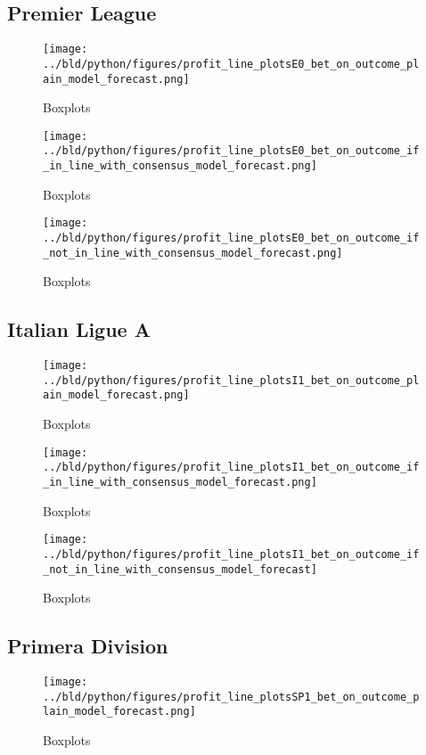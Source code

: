 \documentclass[11pt, a4paper, leqno]{article}
\begin{document}
\subsection{Premier League}
\begin{figure}[H]
    \centering
    \texttt{[image: ../bld/python/figures/profit\_line\_plotsE0\_bet\_on\_outcome\_plain\_model\_forecast.png]}
    \caption{Boxplots}
    \label{fig:figure2}
\end{figure}

\begin{figure}[H]
    \centering
    \texttt{[image: ../bld/python/figures/profit\_line\_plotsE0\_bet\_on\_outcome\_if\_in\_line\_with\_consensus\_model\_forecast.png]}
    \caption{Boxplots}
    \label{fig:figure2}
\end{figure}
\begin{figure}[H]
    \centering
    \texttt{[image: ../bld/python/figures/profit\_line\_plotsE0\_bet\_on\_outcome\_if\_not\_in\_line\_with\_consensus\_model\_forecast.png]}
    \caption{Boxplots}
    \label{fig:figure2}
\end{figure}





\subsection{Italian Ligue A}
\begin{figure}[H]
    \centering
    \texttt{[image: ../bld/python/figures/profit\_line\_plotsI1\_bet\_on\_outcome\_plain\_model\_forecast.png]}
    \caption{Boxplots}
    \label{fig:figure2}
\end{figure}

\begin{figure}[H]
    \centering
    \texttt{[image: ../bld/python/figures/profit\_line\_plotsI1\_bet\_on\_outcome\_if\_in\_line\_with\_consensus\_model\_forecast.png]}
    \caption{Boxplots}
    \label{fig:figure2}
\end{figure}
\begin{figure}[H]
    \centering
    \texttt{[image: ../bld/python/figures/profit\_line\_plotsI1\_bet\_on\_outcome\_if\_not\_in\_line\_with\_consensus\_model\_forecast]}
    \caption{Boxplots}
    \label{fig:figure2}
\end{figure}



\subsection{Primera Division}
\begin{figure}[H]
    \centering
    \texttt{[image: ../bld/python/figures/profit\_line\_plotsSP1\_bet\_on\_outcome\_plain\_model\_forecast.png]}
    \caption{Boxplots}
    \label{fig:figure2}
\end{figure}
\end{document}
